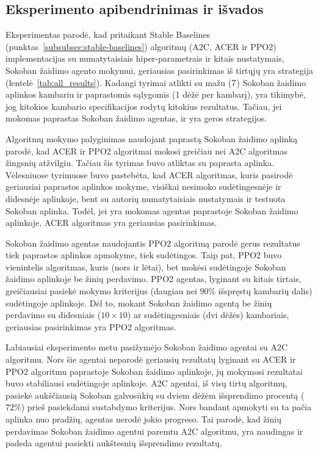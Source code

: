 \documentclass{VUMIFPSbakalaurinis}
\begin{document}
\subsection{Eksperimento apibendrinimas ir išvados}
{
	Eksperimentas parodė, kad pritaikant Stable Baselines (punktas~\ref{subsubsec:stable-baselines}) algoritmų (A2C, ACER ir PPO2) implementacijas su numatytaisiais hiper-parametrais ir kitais nustatymais, Sokoban žaidimo agento mokymui, geriausias pasirinkimas iš tirtųjų  yra  strategija (lentelė~\ref{tab:all_results}). Kadangi tyrimai atlikti su mažu (\(7 \time 7\)) Sokoban žaidimo aplinkos kambariu ir paprastomis sąlygomis (1 dėžė per kambarį), yra tikimybė, jog kitokios kambario specifikacijos rodytų kitokius rezultatus. Tačiau, jei mokomas paprastas Sokoban žaidimo agentas,  ir  yra geros strategijos.\par
	
	Algoritmų mokymo palyginimas naudojant paprastą Sokoban žaidimo aplinką parodė, kad ACER ir PPO2 algoritmai mokosi greičiau nei A2C algoritmas žingsnių atžvilgiu. Tačiau šis tyrimas buvo atliktas su paprasta aplinka. Vėlesniuose tyrimuose buvo pastebėta, kad ACER algoritmas, kuris pasirodė geriausiai paprastos aplinkos mokyme, visiškai nesimoko sudėtingesnėje ir didesnėje aplinkoje, bent su autorių numatytaisiais nustatymais ir testuota Sokoban aplinka. Todėl, jei yra mokomas agentas paprastoje Sokoban žaidimo aplinkoje, ACER algoritmas yra geriausias pasirinkimas.\par
	
	Sokoban žaidimo agentas naudojantis PPO2 algoritmą parodė gerus rezultatus tiek paprastos aplinkos apmokyme, tiek sudėtingos. Taip pat, PPO2 buvo vienintelis algoritmas, kuris (nors ir lėtai), bet mokėsi sudėtingoje Sokoban žaidimo aplinkoje be žinių perdavimo. PPO2 agentas, lyginant su kitais tirtais, greičiausiai pasiekė mokymo kriterijus (daugiau nei \(90\%\) išspręstų kambarių dalis) sudėtingoje aplinkoje. Dėl to, mokant Sokoban žaidimo agentą be žinių perdavimo su didesniais (\(10 \times 10\)) ar sudėtingesniais (dvi dėžės) kambariais, geriausias pasirinkimas yra PPO2 algoritmas. \par
	 
	Labiausiai eksperimento metu pasižymėjo Sokoban žaidimo agentai su A2C algoritmu. Nors šie agentai neparodė geriausių rezultatų lyginant su ACER ir PPO2 algoritmu paprastoje Sokoban žaidimo aplinkoje, jų mokymosi rezultatai buvo stabiliausi sudėtingoje aplinkoje. A2C agentai, iš visų tirtų algoritmų, pasiekė aukščiausią Sokoban galvosūkių su dviem dėžėm išsprendimo procentą (\(72\%\)) prieš pasiekdami sustabdymo kriterijus. Nors bandant apmokyti su ta pačia aplinka nuo pradžių, agentas nerodė jokio progreso. Tai parodė, kad žinių perdavimas Sokoban žaidimo agentui paremtu A2C algoritmu, yra naudingas ir padeda agentui pasiekti aukštesnių išsprendimo rezultatų.\par
	
}
\end{document}
